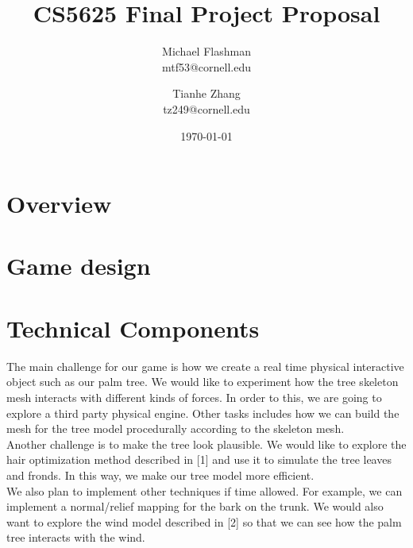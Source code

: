 \documentclass[11pt]{article}
\begin{document}
\title{CS5625 Final Project Proposal}
\author{Michael Flashman \\ mtf53@cornell.edu \and Tianhe Zhang \\ tz249@cornell.edu\\}
\date{\today}
\maketitle


\section{Overview}

\section{Game design}

\section{Technical Components}
The main challenge for our game is how we create a real time physical interactive object such as our palm tree. We would like to experiment how the tree skeleton mesh interacts with different kinds of forces. In order to this, we are going to explore a third party physical engine. Other tasks includes how we can build the mesh for the tree model procedurally according to the skeleton mesh.\\

Another challenge is to make the tree look plausible. We would like to explore the hair optimization method described in [1] and use it to simulate the tree leaves and fronds. In this way, we make our tree model more efficient.\\

We also plan to implement other techniques if time allowed. For example, we can implement a normal/relief mapping for the bark on the trunk. We would also want to explore the wind model described in [2] so that we can see how the palm tree interacts with the wind.

\end{document}
